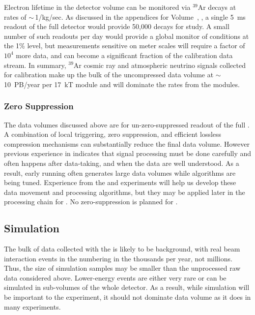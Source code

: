 Electron lifetime in the detector volume can be monitored via $^{39}$Ar decays  at rates of $\sim\,$1/kg/sec. As discussed in the appendices for 
Volume~\volnumberphysics{}, \voltitlephysics{},  a single \SI{5}{ms} readout of the full detector would provide 50,000 decays for study.  A small number of such readouts per day would provide a global monitor of conditions at the 1\% level, but measurements sensitive on meter scales will require a factor of $10^4$ more data, and can become a significant fraction of the calibration data stream. In summary, $^{39}$Ar cosmic ray and atmospheric neutrino signals collected for calibration make up the bulk of the uncompressed  data volume at $\sim\,$\SI{10}{PB/year} per \SI{17}{kT} module and will dominate the rates from the  modules.  

\subsubsection{Zero Suppression}
\label{sec:exec-comp-cal-zs}

The data volumes discussed above are for un-zero-suppressed readout of the full . A combination of local triggering, zero suppression, and  efficient lossless compression mechanisms can substantially reduce the final data volume. However previous experience in  indicates that signal processing must be done carefully and often happens after data-taking, and when the data are well understood.  As a result, early running often generates large data volumes while algorithms are being tuned. 
Experience from  the  and  experiments will help us develop these data movement and processing algorithms, but they may be applied later in the processing chain for .  No zero-suppression is planned for .



\subsection{Simulation}
\label{sec:exec-comp-dt-sim}

The bulk of data collected with the  is likely to be background, with real beam interaction events in the  numbering in the thousands per year, not millions. Thus, the size of simulation samples may be %
smaller than the unprocessed raw data considered above.  Lower-energy events are either very rare or can be simulated in sub-volumes of the whole detector.  As a result, while simulation will be important to the experiment, it should not dominate data volume as it does in many experiments.  

